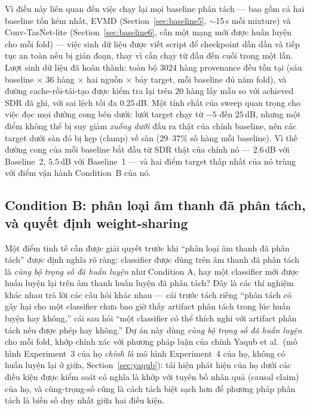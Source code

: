 \documentclass[11pt]{article}
\begin{document}
Vì điều này liên quan đến việc chạy lại mọi baseline phân tách --- bao
gồm cả hai baseline tốn kém nhất, EVMD (Section~\ref{sec:baseline5},
$\sim$15\,s mỗi mixture) và Conv-TasNet-lite (Section~\ref{sec:baseline6},
cần một mạng mới được huấn luyện cho mỗi fold) --- việc sinh dữ liệu được
viết script để checkpoint dần dần và tiếp tục an toàn nếu bị gián đoạn,
thay vì cần chạy từ đầu đến cuối trong một lần. Lượt sinh dữ liệu đã hoàn
thành: toàn bộ $3024$ hàng provenance đều tồn tại (sáu baseline $\times$
36 hàng $\times$ hai nguồn $\times$ bảy target, mỗi baseline đủ năm fold),
và đường cache-rồi-tái-tạo được kiểm tra lại trên 20 hàng lấy mẫu so với
achieved SDR đã ghi, với sai lệch tối đa $0.25$\,dB. Một tính chất của
sweep quan trọng cho việc đọc mọi đường cong bên dưới: lưới target chạy từ
$-5$ đến $25$\,dB, nhưng một điểm không thể bị suy giảm \emph{xuống dưới}
đầu ra thật của chính baseline, nên các target dưới sàn đó bị kẹp
(clamp) về sàn (29--37\% số hàng mỗi baseline). Vì thế đường cong của mỗi
baseline bắt đầu từ SDR thật của chính nó --- $2.6$\,dB với Baseline~2,
$5.5$\,dB với Baseline~1 --- và hai điểm target thấp nhất của nó trùng với
điểm vận hành Condition~B của nó.

\subsection{Condition B: phân loại âm thanh đã phân tách, và quyết định weight-sharing}
\label{sec:conditionb}

Một điểm tinh tế cần được giải quyết trước khi ``phân loại âm thanh đã
phân tách'' được định nghĩa rõ ràng: classifier được dùng trên âm thanh
đã phân tách là \emph{cùng bộ trọng số đã huấn luyện} như Condition A,
hay một classifier mới được huấn luyện lại trên âm thanh huấn luyện đã
phân tách? Đây là các thí nghiệm khác nhau trả lời các câu hỏi khác
nhau --- cái trước tách riêng ``phân tách có gây hại cho một classifier
chưa bao giờ thấy artifact phân tách trong lúc huấn luyện hay không,''
cái sau hỏi ``một classifier có thể thích nghi với artifact phân tách
nếu được phép hay không.'' Dự án này dùng \emph{cùng bộ trọng số đã huấn
luyện} cho mỗi fold, khớp chính xác với phương pháp luận của chính Yaqub
et al.\ (mô hình Experiment~3 của họ \emph{chính là} mô hình
Experiment~4 của họ, không có huấn luyện lại ở giữa,
Section~\ref{sec:yaqub}): tái hiện phát hiện của họ dưới các điều kiện
được kiểm soát có nghĩa là khớp với tuyên bố nhân quả (causal claim) của
họ, và cùng-trọng-số cũng là cách tách biệt sạch hơn để phương pháp phân
tách là biến số duy nhất giữa hai điều kiện.
\end{document}
